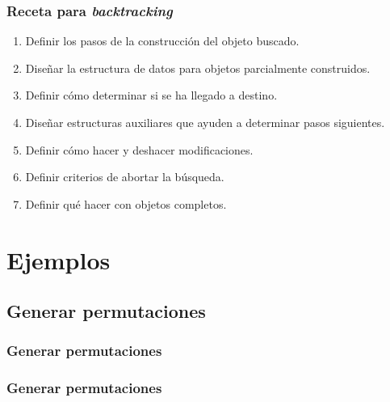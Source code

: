 \documentclass[english, spanish, fleqn,%
hyperref = {colorlinks, urlcolor = blue}%
]{beamer}
\begin{document}
\begin{frame}
  \setcounter{beamerpauses}{2}
  \frametitle{Receta para \emph{backtracking}}

  \begin{enumerate}[font = \textbf, label = {(\alph*)}]
  \item
    Definir los pasos de la construcción del objeto buscado.
  \item
    Diseñar la estructura de datos para objetos parcialmente construidos.
  \item
    Definir cómo determinar si se ha llegado a destino.
  \item
    Diseñar estructuras auxiliares
    que ayuden a determinar pasos siguientes.
  \item
    Definir cómo hacer y deshacer modificaciones.
  \item
    Definir criterios de abortar la búsqueda.
  \item
    Definir qué hacer con objetos completos.
  \end{enumerate}
\end{frame}

\section{Ejemplos}

\subsection{Generar permutaciones}

\begin{frame}
  \setcounter{beamerpauses}{2}
  \frametitle{Generar permutaciones}

  \bigskip
\end{frame}

\begin{frame}
  \setcounter{beamerpauses}{2}
  \frametitle{Generar permutaciones}

\end{frame}
\end{document}
